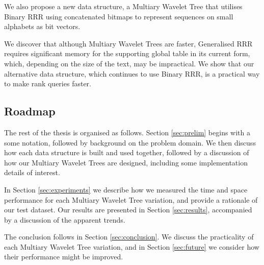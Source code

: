 We also propose a new data structure, a Multiary Wavelet Tree that utilises 
Binary RRR using concatenated bitmaps to represent sequences on small alphabets 
as bit vectors.

We discover that although Multiary Wavelet Trees are faster, Generalised RRR 
requires significant memory for the supporting global table in its current form, 
which, depending on the size of the text, may be impractical. We show that our 
alternative data structure, which continues to use Binary RRR, is a practical 
way to make rank queries faster.


\subsection{Roadmap}

The rest of the thesis is organised as follows. Section \ref{sec:prelim} begins 
with a some notation, followed by background on the problem 
domain. We then discuss how each data structure is built and used together, 
followed by a discussion of how our Multiary Wavelet Trees are designed, 
including some implementation details of interest.

In Section \ref{sec:experiments} we describe how we measured the 
time and space performance for each Multiary Wavelet Tree variation,
and provide a rationale of our test dataset. Our results are presented in 
Section \ref{sec:results}, accompanied by a discussion of the apparent trends.

The conclusion follows in Section \ref{sec:conclusion}. We discuss the 
practicality of each Multiary Wavelet Tree variation, and in Section \ref{sec:future} we 
consider how their performance might be improved.

